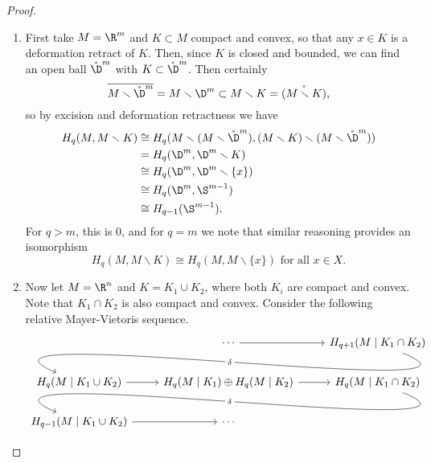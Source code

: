 \documentclass[main.tex]{subfiles}
\begin{document}
\begin{proof}
  \leavevmode
  \begin{enumerate}
    \item First take \(M = \R^{m}\) and \(K \subset M\) compact and convex, so that any \(x \in K\) is a deformation retract of \(K\). Then, since \(K\) is closed and bounded, we can find an open ball \(\mathring{\D}^{m}\) with \(K \subset \mathring{\D}^{m}\). Then certainly
      \begin{equation*}
        \overline{M \smallsetminus \mathring{\D}^{m}} = M \smallsetminus \D^{m} \subset M \smallsetminus K = \mathring{(M \smallsetminus K)},
      \end{equation*}
      so by excision and deformation retractness we have
      \begin{align*}
        H_{q}(M, M \smallsetminus K) &\cong H_{q}(M \smallsetminus (M \smallsetminus \mathring{\D}^{m}), (M \smallsetminus K) \smallsetminus (M \smallsetminus \mathring{\D}^{m})) \\
        &= H_{q}(\D^{m}, \D^{m} \smallsetminus K) \\
        &\cong H_{q}(\D^{m}, \D^{m} \smallsetminus \{x\}) \\
        &\cong H_{q}(\D^{m}, \S^{m-1}) \\
        &\cong H_{q-1}(\S^{m-1}).
      \end{align*}
      For \(q > m\), this is \(0\), and for \(q = m\) we note that similar reasoning provides an isomorphism
      \begin{equation*}
        H_{q}(M, M \smallsetminus K) \cong H_{q}(M, M \smallsetminus \{x\})\text{ for all } x \in X.
      \end{equation*}

    \item Now let \(M = \R^{n}\) and \(K = K_{1} \cup K_{2}\), where both \(K_{i}\) are compact and convex. Note that \(K_{1} \cap K_{2}\) is also compact and convex. Consider the following relative Mayer-Vietoris sequence.
      \begin{equation*}
        \begin{tikzcd}
          & \cdots
          \arrow[r]
          & H_{q+1}(M\mid K_{1} \cap K_{2})
          \\
          H_{q}(M\mid K_{1} \cup K_{2})
          \arrow[from=urr, out=-22, in=157, looseness=1, overlay, "\delta" description]
          \arrow[r]
          & H_{q}(M\mid K_{1}) \oplus H_{q}(M\mid K_{2})
          \arrow[r]
          & H_{q}(M\mid K_{1} \cap K_{2})
          \\
          H_{q-1}(M\mid K_{1} \cup K_{2})
          \arrow[r]
          \arrow[from=urr, out=-22, in=157, looseness=1, overlay, "\delta" description]
          & \cdots
        \end{tikzcd}
      \end{equation*}


\end{enumerate}
\end{proof}
\end{document}
